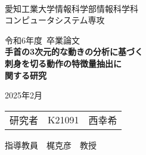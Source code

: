 \begin{titlepage}

\ \\
\begin{center}

{\LARGE 愛知工業大学情報科学部情報科学科\\
コンピュータシステム専攻

\vspace{1.0cm}

令和6年度~卒業論文\\

\vspace{2.0cm}
{\Huge
\baselineskip=15mm
\textbf{手首の3次元的な動きの分析に基づく\\
刺身を切る動作の特徴量抽出に\\関する研究\\}}

\vspace{7.0cm}

2025年2月\\

\vspace{1.0cm}

\begin{tabular}[h]{lll}
  研究者  & K21091 & 西幸希\\
\end{tabular}

\vspace{1.0cm}

指導教員\ \ 梶克彦\ \ 教授}

\end{center}

\end{titlepage}
